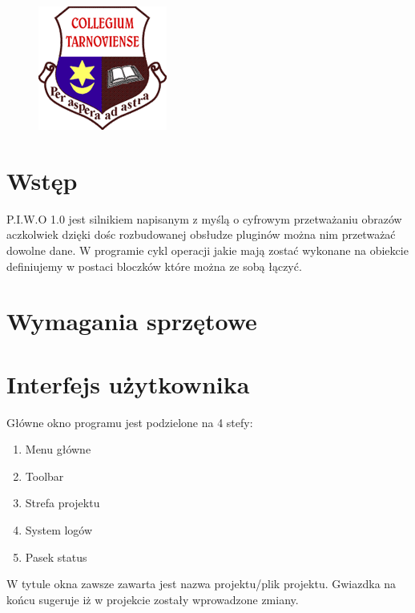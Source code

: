 \documentclass[a4paper,10pt]{article}
\title{\textbf{\begin{LARGE}P.I.W.O. 1.0\end{LARGE}}\\\underline{Projekt Informatyczny} \\ Wilqu \& Others \\\textbf{Instrukcja użytkownika}}
\author{Piotr Wilk \and Piotr Zegar \and Mateusz Tylek \and Mateusz Kocąb \and Wojciech Zbiegieł \and Sławomir Librant \and  Marek Prząda}
\begin{document}
\maketitle
\begin{figure}[h]
 \centering
\includegraphics{logo}
\begin{center}
\begin{center}

\end{center}

\end{center}

\end{figure}
\newpage
\tableofcontents
\newpage

\section{Wstęp}
P.I.W.O 1.0 jest silnikiem napisanym z myślą o cyfrowym przetważaniu obrazów aczkolwiek dzięki dośc rozbudowanej obsłudze pluginów można nim przetważać dowolne dane. W programie cykl operacji jakie mają zostać wykonane na obiekcie definiujemy w postaci bloczków które można ze sobą łączyć.
\section{Wymagania sprzętowe}

\section{Interfejs użytkownika}
Główne okno programu jest podzielone na 4 stefy:
\begin{enumerate}
 \item Menu główne
 \item Toolbar
 \item Strefa projektu
 \item System logów
 \item Pasek status
\end{enumerate}
W tytule okna zawsze zawarta jest nazwa projektu/plik projektu. Gwiazdka na końcu sugeruje iż w projekcie zostały wprowadzone zmiany.
\end{document}

